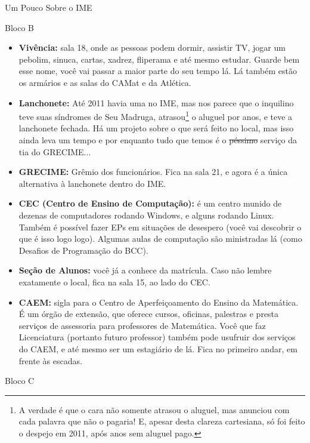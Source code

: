 \begin{secao}{Um Pouco Sobre o IME}
\begin{subsecao}{Bloco B}
\begin{itemize}
\item {\bf Vivência:} sala 18, onde as pessoas podem dormir, assistir TV, jogar
um pebolim, sinuca, cartas, xadrez, fliperama e até mesmo estudar. Guarde bem
esse nome, você vai passar a maior parte do seu tempo lá. Lá também estão os
armários e as salas do CAMat e da Atlética. 
\item {\bf Lanchonete:} Até 2011 havia uma no IME, mas nos parece que o inquilino
teve suas síndromes de Seu Madruga, atrasou\footnote{A verdade é que o cara não
somente atrasou o aluguel, mas anunciou com cada palavra que não o pagaria! E,
apesar desta clareza cartesiana, só foi feito o despejo em 2011, após anos sem
aluguel pago.} o aluguel por anos, e teve a lanchonete fechada. Há um projeto
sobre o que será feito no local, mas isso ainda leva um tempo e por enquanto
tudo que temos é o \sout{péssimo} serviço da tia do GRECIME... 

\item {\bf GRECIME:} Grêmio dos funcionários. Fica na sala 21, e agora é a única
alternativa à lanchonete dentro do IME.

\item {\bf CEC (Centro de Ensino de Computação):} é um centro munido de dezenas
de computadores rodando Windows, e alguns rodando Linux. Também é possível fazer
EPs em situações de desespero (você vai descobrir o que é isso logo logo). Algumas
aulas de computação são ministradas lá (como Desafios de Programação do BCC).
 
\item {\bf Seção de Alunos:} você já a conhece da matrícula. Caso não lembre
exatamente o local, fica na sala 15, ao lado do CEC.

\item {\bf CAEM:} sigla para o Centro de Aperfeiçoamento do Ensino da Matemática.
É um órgão de extensão, que oferece cursos, oficinas, palestras e presta serviços
de assessoria para professores de Matemática. Você que faz Licenciatura (portanto
futuro professor) também pode usufruir dos serviços do CAEM, e até mesmo ser um
estagiário de lá. Fica no primeiro andar, em frente às escadas.

\end{itemize}
\end{subsecao}

\begin{subsecao}{Bloco C}


\end{subsecao}
\end{secao}
